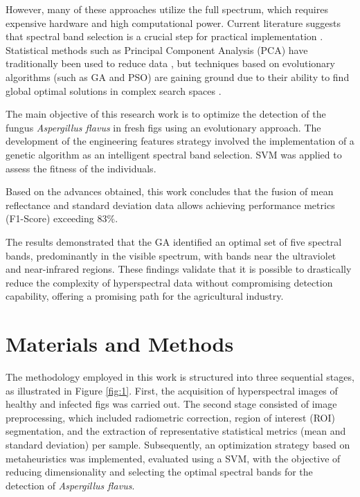 \documentclass[runningheads]{llncs}
\begin{document}
However, many of these approaches utilize the full spectrum, which requires expensive hardware and high computational power. 
Current literature suggests that spectral band selection is a crucial step for practical implementation \cite{sawant_survey_2020}. 
Statistical methods such as Principal Component Analysis (PCA) have traditionally been used to reduce data \cite{chu_classifying_2020}, but techniques based on evolutionary algorithms (such as GA and PSO) are gaining ground due to their ability to find global optimal solutions in complex search spaces \cite{sawant_survey_2020}.

The main objective of this research work is to optimize the detection of the fungus \textit{Aspergillus flavus} in fresh figs using an evolutionary approach. The development of the engineering features strategy involved the implementation of a genetic algorithm as an intelligent spectral band selection. SVM was applied to assess the fitness of the individuals.

Based on the advances obtained, this work concludes that the fusion of mean reflectance and standard deviation data allows achieving performance metrics (F1-Score) exceeding $83\%$. %

The results demonstrated that the GA identified an optimal set of five spectral bands, predominantly in the visible spectrum, with bands near the ultraviolet and near-infrared regions.
These findings validate that it is possible to drastically reduce the complexity of hyperspectral data without compromising detection capability, offering a promising path for the agricultural industry.

\section{Materials and Methods}

The methodology employed in this work is structured into three sequential stages, as illustrated in Figure \ref{fig:1}. 
First, the acquisition of hyperspectral images of healthy and infected figs was carried out. 
The second stage consisted of image preprocessing, which included radiometric correction, region of interest (ROI) segmentation, and the extraction of representative statistical metrics (mean and standard deviation) per sample. 
Subsequently, an optimization strategy based on metaheuristics was implemented, evaluated using a SVM, with the objective of reducing dimensionality and selecting the optimal spectral bands for the detection of \textit{Aspergillus flavus}.
\end{document}
